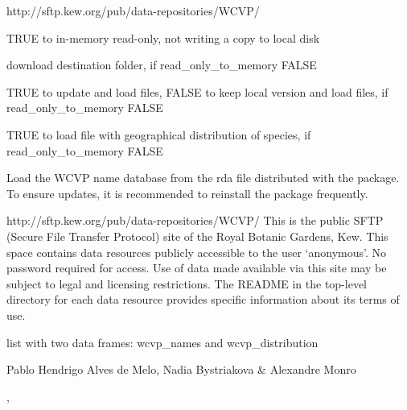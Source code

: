 \documentclass[a4paper]{book}
\begin{document}
\begin{Arguments}
\begin{ldescription}
\item[\code{url\_source}] http://sftp.kew.org/pub/data-repositories/WCVP/

\item[\code{read\_only\_to\_memory}] TRUE to in-memory read-only, not writing a copy to local disk

\item[\code{path\_results}] download destination folder, if read\_only\_to\_memory FALSE

\item[\code{update}] TRUE to update and load files, FALSE to keep local version and load files, if read\_only\_to\_memory FALSE

\item[\code{load\_distribution}] TRUE to load file with geographical distribution of species, if read\_only\_to\_memory FALSE

\item[\code{load\_rda\_data}] Load the WCVP name database from the rda file distributed with the package. To ensure updates, it is recommended to reinstall the package frequently.
\end{ldescription}
\end{Arguments}
%
\begin{Details}
http://sftp.kew.org/pub/data-repositories/WCVP/ This is the public SFTP (Secure File Transfer Protocol) site of the Royal Botanic Gardens, Kew. This space contains data resources publicly accessible to the user `anonymous'.  No password required for access. Use of data made available via this site may be subject to legal and licensing restrictions. The README in the top-level directory for each data resource provides specific information about its terms of use.
\end{Details}
%
\begin{Value}
list with two data frames: wcvp\_names and wcvp\_distribution
\end{Value}
%
\begin{Author}
Pablo Hendrigo Alves de Melo,
Nadia Bystriakova \&
Alexandre Monro
\end{Author}
%
\begin{SeeAlso}
, 
\end{SeeAlso}
%
\end{document}
